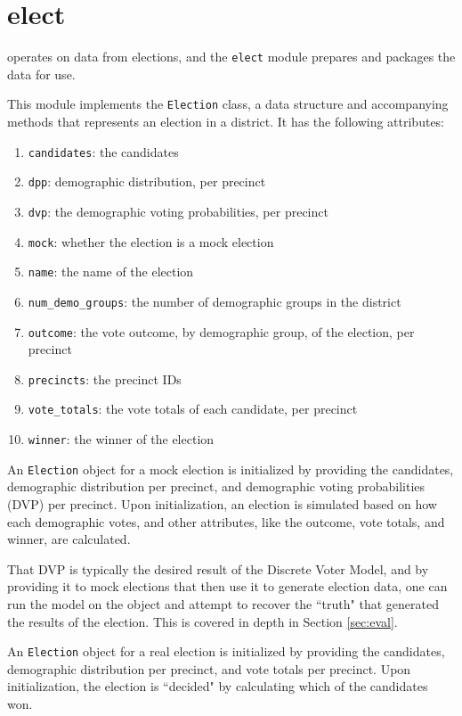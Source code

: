 \section{elect}
\label{sec:elect}

 operates on data from elections, and the \texttt{elect} module prepares and packages the data for use.

This module implements the \texttt{Election} class, a data structure and accompanying methods that represents an election in a district. It has the following attributes:

\begin{enumerate}
  \item \texttt{candidates}: the candidates
  \item \texttt{dpp}: demographic distribution, per precinct
  \item \texttt{dvp}: the demographic voting probabilities, per precinct
  \item \texttt{mock}: whether the election is a mock election
  \item \texttt{name}: the name of the election
  \item \texttt{num\_demo\_groups}: the number of demographic groups in the district
  \item \texttt{outcome}: the vote outcome, by demographic group, of the election, per precinct
  \item \texttt{precincts}: the precinct IDs
  \item \texttt{vote\_totals}: the vote totals of each candidate, per precinct
  \item \texttt{winner}: the winner of the election
\end{enumerate}

An \texttt{Election} object for a mock election is initialized by providing the candidates, demographic distribution per precinct, and demographic voting probabilities (DVP) per precinct. Upon initialization, an election is simulated based on how each demographic votes, and other attributes, like the outcome, vote totals, and winner, are calculated.

That DVP is typically the desired result of the Discrete Voter Model, and by providing it to mock elections that then use it to generate election data, one can run the model on the object and attempt to recover the ``truth" that generated the results of the election. This is covered in depth in Section \ref{sec:eval}.

An \texttt{Election} object for a real election is initialized by providing the candidates, demographic distribution per precinct, and vote totals per precinct. Upon initialization, the election is ``decided" by calculating which of the candidates won.


